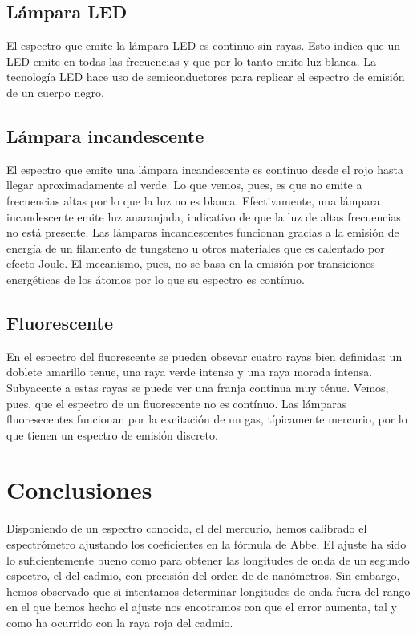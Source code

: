 \documentclass[12pt]{article}
\numberwithin{table}{section}
\numberwithin{figure}{section}
\numberwithin{equation}{section}
\begin{document}
\subsection{Lámpara LED}
El espectro que emite la lámpara LED es continuo sin rayas. Esto indica que un LED emite en todas las frecuencias y que por lo tanto emite luz blanca. La tecnología LED hace uso de semiconductores para replicar el  espectro de emisión de un cuerpo negro.

\subsection{Lámpara incandescente}
El espectro que emite una lámpara incandescente es continuo desde el rojo hasta llegar aproximadamente al verde. Lo que vemos, pues, es que no emite a frecuencias altas por lo que la luz no es blanca. Efectivamente, una lámpara incandescente emite luz anaranjada, indicativo de que la luz de altas frecuencias no está presente. Las lámparas incandescentes funcionan gracias a la emisión de energía de un filamento de tungsteno u otros materiales que es calentado por efecto Joule. El mecanismo, pues, no se basa en la emisión por transiciones energéticas de los átomos por lo que su espectro es contínuo.

\subsection{Fluorescente}
En el espectro del fluorescente se pueden obsevar cuatro rayas bien definidas: un doblete amarillo tenue, una raya verde intensa y una raya morada intensa. Subyacente a estas rayas se puede ver una franja continua muy ténue. Vemos, pues, que el espectro de un fluorescente no es contínuo. Las lámparas fluoresecentes funcionan por la excitación de un gas, típicamente mercurio, por lo que tienen un espectro de emisión discreto.

\section{Conclusiones}
Disponiendo de un espectro conocido, el del mercurio, hemos calibrado el espectrómetro ajustando los coeficientes en la fórmula de Abbe. El ajuste ha sido lo suficientemente bueno como para obtener las longitudes de onda de un segundo espectro, el del cadmio, con precisión del orden de de nanómetros. Sin embargo, hemos observado que si intentamos determinar longitudes de onda fuera del rango en el que hemos hecho el ajuste nos encotramos con que el error aumenta, tal y como ha ocurrido con la raya roja del cadmio.
\end{document}
